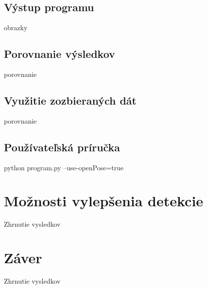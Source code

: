 \documentclass[slovak,master,dept460,male,cpp,cpdeclaration]{diploma}
\begin{document}
\newpage
\subsection{Výstup programu}
obrazky

\newpage
\subsection{Porovnanie výsledkov}
porovnanie


\newpage
\subsection{Využitie zozbieraných dát}
porovnanie


\newpage
\subsection{Používateľská príručka}
python program.py --use-openPose=true


\newpage
\section{Možnosti vylepšenia detekcie}
\label{sec:Možnosti vylepšenia detekcie}
Zhrnutie vysledkov


\newpage
\section{Záver}
\label{sec:Zaver}
Zhrnutie vysledkov








\end{document}
